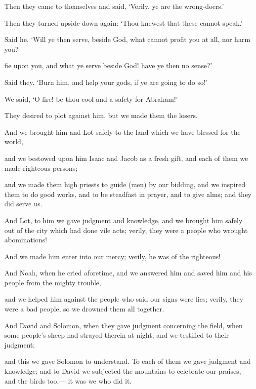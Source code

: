 \documentclass[fontsize=14pt, letterpaper, notitlepage, openany, DIV=12]{scrbook} %
\begin{document}
\noindent[21:64]
Then they came to themselves and said, `Verily, ye are the wrong-doers.'

\noindent[21:65]
Then they turned upside down again: `Thou knewest that these cannot speak.'

\noindent[21:66]
Said he, `Will ye then serve, beside God, what cannot profit you at all, nor harm you?

\noindent[21:67]
fie upon you, and what ye serve beside God! have ye then no sense?'

\noindent[21:68]
Said they, `Burn him, and help your gods, if ye are going to do so!'

\noindent[21:69]
We said, `O fire! be thou cool and a safety for Abraham!'

\noindent[21:70]
They desired to plot against him, but we made them the losers.

\noindent[21:71]
And we brought him and Lot safely to the land which we have blessed for the world,

\noindent[21:72]
and we bestowed upon him Isaac and Jacob as a fresh gift, and each of them we made
righteous persons;

\noindent[21:73]
and we made them high priests to guide (men) by our bidding, and we inspired them to
do good works, and to be steadfast in prayer, and to give alms; and they did serve us.

\noindent[21:74]
And Lot, to him we gave judgment and knowledge, and we brought him safely out of the
city which had done vile acts; verily, they were a people who wrought abominations!

\noindent[21:75]
And we made him enter into our mercy; verily, he was of the righteous!

\noindent[21:76]
And Noah, when he cried aforetime, and we answered him and saved him and his people
from the mighty trouble,

\noindent[21:77]
and we helped him against the people who said our signs were lies; verily, they were a
bad people, so we drowned them all together.

\noindent[21:78]
And David and Solomon, when they gave judgment concerning the field, when some
people's sheep had strayed therein at night; and we testified to their judgment;

\noindent[21:79]
and this we gave Solomon to understand. To each of them we gave judgment and
knowledge; and to David we subjected the mountains to celebrate our praises, and the birds
too,--- it was we who did it.
\end{document}
